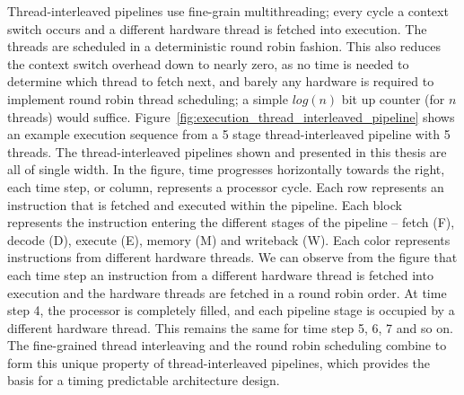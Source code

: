 Thread-interleaved pipelines use fine-grain multithreading; every cycle a context switch occurs and a different hardware thread is fetched into execution. 
The threads are scheduled in a deterministic round robin fashion. 
This also reduces the context switch overhead down to nearly zero, as no time is needed to determine which thread to fetch next, and barely any hardware is required to implement round robin thread scheduling; a simple $log(n)$ bit up counter (for $n$ threads) would suffice.         
Figure~\ref{fig:execution_thread_interleaved_pipeline} shows an example execution sequence from a 5 stage thread-interleaved pipeline with 5 threads.
The thread-interleaved pipelines shown and presented in this thesis are all of single width.
In the figure, time progresses horizontally towards the right, each time step, or column, represents a processor cycle.
Each row represents an instruction that is fetched and executed within the pipeline.
Each block represents the instruction entering the different stages of the pipeline -- fetch (F), decode (D), execute (E), memory (M) and writeback (W).   
Each color represents instructions from different hardware threads.
We can observe from the figure that each time step an instruction from a different hardware thread is fetched into execution and the hardware threads are fetched in a round robin order.
At time step 4, the processor is completely filled, and each pipeline stage is occupied by a different hardware thread.
This remains the same for time step 5, 6, 7 and so on. 
The fine-grained thread interleaving and the round robin scheduling combine to form this unique property of thread-interleaved pipelines, which provides the basis for a timing predictable architecture design.

